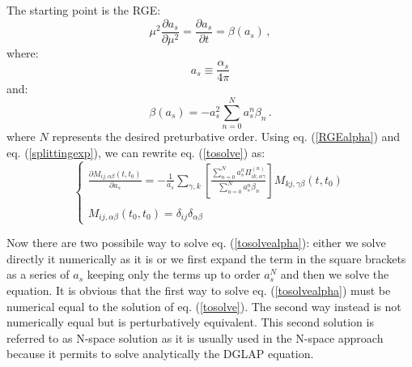 \documentclass[10pt,a4paper]{article}
\begin{document}
The starting point is the RGE:
\begin{equation}
\mu^2\frac{\partial a_s}{\partial \mu^2} = \frac{\partial
  a_s}{\partial t} = \beta(a_s)\,,
\label{RGEalpha}
\end{equation}
where:
\begin{equation}
a_s \equiv \frac{\alpha_s}{4\pi}
\end{equation}
and:
\begin{equation}
\beta(a_s) = -a_s^2 \sum_{n=0}^{N} a_s^n \beta_n \,.
\end{equation}
where $N$ represents the desired preturbative order.
Using eq. (\ref{RGEalpha}) and eq. (\ref{splittingexp}), we can
rewrite eq. (\ref{tosolve}) as:
\begin{equation}
\left\{\begin{array}{l}
\displaystyle \frac{\partial  M_{ij,\alpha\beta}(t,t_0)}{\partial
  a_s}= -\frac{1}{a_s}\sum_{\gamma,k} \left[\frac{\displaystyle \sum_{n=0}^N a_s^n
    \Pi_{ik,\alpha\gamma}^{(n)}}{ \displaystyle \sum_{n=0}^{N} a_s^n \beta_n}\right]M_{kj,\gamma\beta}(t,t_0)\\
\\
\displaystyle M_{ij,\alpha\beta}(t_0,t_0)=\delta_{ij}\delta_{\alpha\beta}
\end{array}\right.
\label{tosolvealpha}
\end{equation}

Now there are two possibile way to solve eq. (\ref{tosolvealpha}):
either we solve directly it numerically as it is or we first expand
the term in the square brackets as a series of $a_s$ keeping only the
terms up to order $a_s^N$ and then we solve the equation. It is
obvious that the first way to solve eq. (\ref{tosolvealpha}) must be
numerical equal to the solution of
eq. (\ref{tosolve}). The second way instead is not numerically equal
but is perturbatively equivalent. This second solution is referred to
as N-space solution as it is usually used in the N-space approach
because it permits to solve analytically the DGLAP equation.
\end{document}
